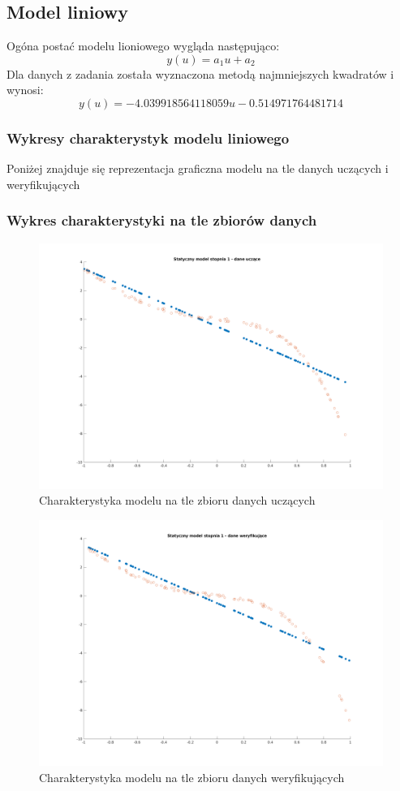 \documentclass[a4paper, 11pt]{article}
\begin{document}
\subsection{Model liniowy}
Ogóna postać modelu lioniowego wygląda następująco: 
$$y(u) = a_1u + a_2$$
Dla danych z zadania została wyznaczona metodą najmniejszych kwadratów i wynosi: 
$$y(u) =-4.039918564118059u -0.514971764481714  $$
\subsubsection{Wykresy charakterystyk modelu liniowego}
Poniżej znajduje się reprezentacja graficzna modelu na tle danych uczących i weryfikujących 
\subsubsection{Wykres charakterystyki na tle zbiorów danych}
\begin{figure}[H]
\centering
\includegraphics[scale=0.50]{dane_stat_1_ucz.png}
\caption{Charakterystyka modelu na tle zbioru danych uczących}
\label{}
\end{figure}
\begin{figure}[H]
\centering
\includegraphics[scale=0.50]{dane_stat_1_wer.png}
\caption{Charakterystyka modelu na tle zbioru danych weryfikujących }
\label{}
\end{figure}
\end{document}
